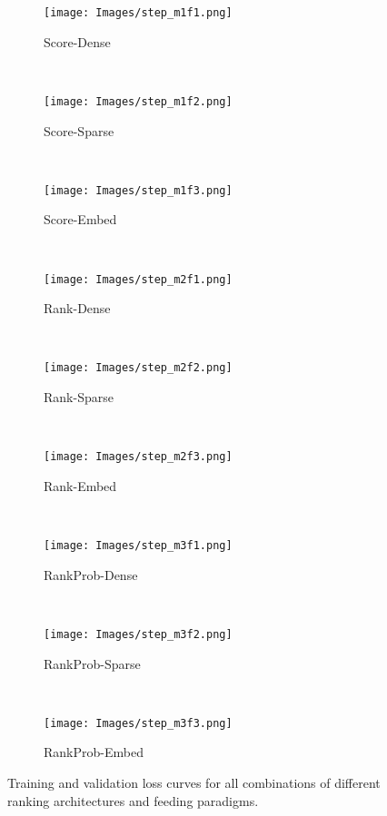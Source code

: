 \documentclass[sigconf]{acmart}
\newcommand{\mone}{Score\xspace}
\newcommand{\mtwo}{Rank\xspace}
\newcommand{\mthree}{RankProb\xspace}
\newcommand{\fone}{Dense\xspace}
\newcommand{\ftwo}{Sparse\xspace}
\newcommand{\fthree}{Embed\xspace}
\begin{document}
\begin{figure*}[t]
    \centering
    \begin{subfigure}[t]{0.3\textwidth}
        \centering
        \texttt{[image: Images/step\_m1f1.png]}
        \caption{\label{fig:m1f1}\mone-\fone}
    \end{subfigure}~
    \begin{subfigure}[t]{0.3\textwidth}
        \centering
        \texttt{[image: Images/step\_m1f2.png]}
        \caption{\label{fig:m1f2}\mone-\ftwo}
    \end{subfigure}~
    \begin{subfigure}[t]{0.3\textwidth}
        \centering
        \texttt{[image: Images/step\_m1f3.png]}
        \caption{\label{fig:m1f3}\mone-\fthree}
    \end{subfigure}\\
    \begin{subfigure}[t]{0.3\textwidth}
        \centering
        \texttt{[image: Images/step\_m2f1.png]}
        \caption{\label{fig:m2f1}\mtwo-\fone}
    \end{subfigure}~
    \begin{subfigure}[t]{0.3\textwidth}
        \centering
        \texttt{[image: Images/step\_m2f2.png]}
        \caption{\label{fig:m2f2}\mtwo-\ftwo}
    \end{subfigure}~
    \begin{subfigure}[t]{0.3\textwidth}
        \centering
        \texttt{[image: Images/step\_m2f3.png]}
        \caption{\label{fig:m2f3}\mtwo-\fthree}
    \end{subfigure}\\
    \begin{subfigure}[t]{0.3\textwidth}
        \centering
        \texttt{[image: Images/step\_m3f1.png]}
        \caption{\label{fig:m3f1}\mthree-\fone}
    \end{subfigure}~
    \begin{subfigure}[t]{0.3\textwidth}
        \centering
        \texttt{[image: Images/step\_m3f2.png]}
        \caption{\label{fig:m3f2}\mthree-\ftwo}
    \end{subfigure}~
    \begin{subfigure}[t]{0.3\textwidth}
        \centering
        \texttt{[image: Images/step\_m3f3.png]}
        \caption{\label{fig:m3f3}\mthree-\fthree}
    \end{subfigure}\vspace{-5pt}
    \caption{Training and validation loss curves for all combinations of different ranking architectures and feeding paradigms.}
    \label{fig:step-loss}
    \vspace{-5pt}
\end{figure*}
\end{document}
